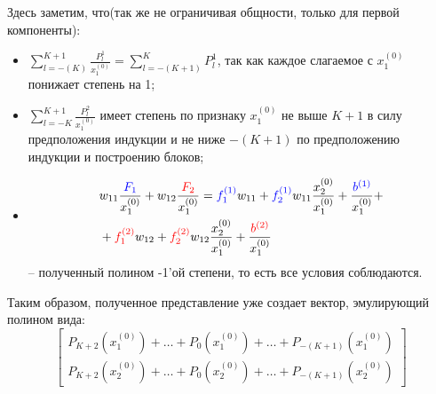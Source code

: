 \documentclass{report}
\begin{document}
\par Здесь заметим, что(так же не ограничивая общности, только для первой компоненты):
\begin{itemize}
    \item $\sum_{l=-(K)}^{K+1}\frac{P_{l}^1}{x_1^{(0)}} = \sum_{l=-(K+1)}^{K}P_{l}^1$, так как каждое слагаемое с $x_1^{(0)}$ понижает степень на 1;
    \item $\sum_{l=-K}^{K+1}\frac{P_{l}^2}{x_1^{(0)}}$ имеет степень по признаку $x_1^{(0)}$ 
    не выше $K+1$ в силу предположения индукции и не ниже $-(K+1)$ по предположению индукции и построению блоков;
    \item 
    \begin{align*}
        &w_{11}\frac{\color{blue}F_1\color{black}}{x_1^{(0)}} + w_{12}\frac{\color{red}F_2\color{black}}{x_1^{(0)}} = \color{blue}f_1^{(1)}\color{black}w_{11} +\color{blue}f_2^{(1)}\color{black}w_{11}\frac{x_2^{(0)}}{x_1^{(0)}} + \frac{\color{blue}b^{(1)}\color{black}}{x_1^{(0)}} + \\
        &+\color{red}f_1^{(2)}\color{black}w_{12} + \color{red}f_2^{(2)}\color{black}w_{12}\frac{x_2^{(0)}}{x_1^{(0)}} + \frac{\color{red}b^{(2)}\color{black}}{x_1^{(0)}}
    \end{align*} -- полученный полином -1'ой степени, то есть все условия соблюдаются.
\end{itemize}

\par Таким образом, полученное представление уже создает вектор, эмулирующий полином вида:
\begin{equation*}
    \begin{bmatrix}
        P_{K+2}(x_1^{(0)}) + \dots + P_{0}(x_1^{(0)}) + \dots + P_{-(K+1)}(x_1^{(0)})\\
        P_{K+2}(x_2^{(0)}) + \dots + P_{0}(x_2^{(0)}) + \dots + P_{-(K+1)}(x_2^{(0)})
    \end{bmatrix}
\end{equation*}
\end{document}
